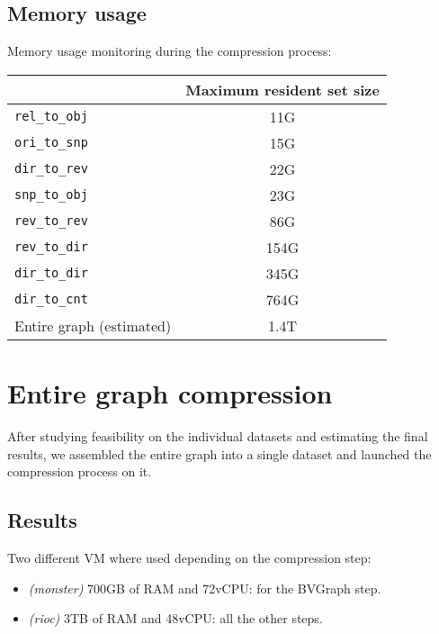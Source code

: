 \documentclass[11pt,a4paper]{article}
\begin{document}
\subsection{Memory usage}

Memory usage monitoring during the compression process:

\begin{center}
    \begin{tabular}{@{} l c @{}}
        \toprule
        \multicolumn{1}{c}{} &
            \textbf{Maximum resident set size} \\
        \midrule
        \texttt{rel\_to\_obj} & 11G \\
        \texttt{ori\_to\_snp} & 15G \\
        \texttt{dir\_to\_rev} & 22G \\
        \texttt{snp\_to\_obj} & 23G \\
        \texttt{rev\_to\_rev} & 86G \\
        \texttt{rev\_to\_dir} & 154G \\
        \texttt{dir\_to\_dir} & 345G \\
        \texttt{dir\_to\_cnt} & 764G \\
        \midrule
        Entire graph (estimated) & 1.4T \\
        \bottomrule
    \end{tabular}
\end{center}

\section{Entire graph compression}

After studying feasibility on the individual datasets and estimating the final
results, we assembled the entire graph into a single dataset and launched the
compression process on it.

\subsection{Results}

Two different VM where used depending on the compression step:

\begin{itemize}
    \item \textit{(monster)} 700GB of RAM and 72vCPU: for the BVGraph step.
    \item \textit{(rioc)} 3TB of RAM and 48vCPU: all the other steps.
\end{itemize}
\end{document}
